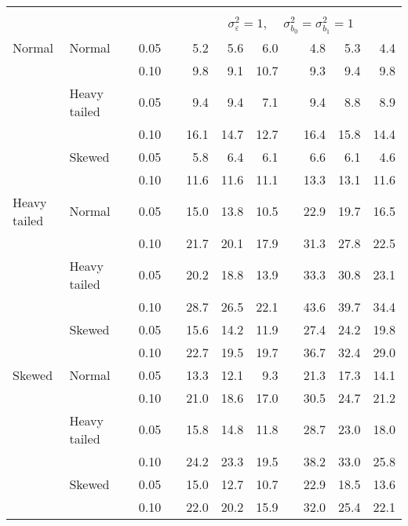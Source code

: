 \begin{table}[ht]
\begin{scriptsize}
\begin{center}
\begin{tabular}{ll p{.1cm} c p{.1cm} rrr p{.1cm} rrr}
&&&&&&&&&&&\\
& && && \multicolumn{7}{c}{$\sigma_{\varepsilon}^2 = 1$, \ \ $\sigma_{b_0}^2 = \sigma_{b_1}^2 = 1$} \\ \cline{6-12}
Normal       & Normal       && 0.05 &&   5.2 & 5.6 & 6.0 &   & 4.8 & 5.3 & 4.4 \\ 
             &              && 0.10 &&   9.8 & 9.1 & 10.7 &   & 9.3 & 9.4 & 9.8 \\ 
             & Heavy tailed && 0.05 &&   9.4 & 9.4 & 7.1 &   & 9.4 & 8.8 & 8.9 \\ 
             &              && 0.10 &&   16.1 & 14.7 & 12.7 &   & 16.4 & 15.8 & 14.4 \\ 
             & Skewed       && 0.05 &&   5.8 & 6.4 & 6.1 &   & 6.6 & 6.1 & 4.6 \\ 
             &              && 0.10 &&   11.6 & 11.6 & 11.1 &   & 13.3 & 13.1 & 11.6 \\ 
Heavy tailed & Normal       && 0.05 &&   15.0 & 13.8 & 10.5 &   & 22.9 & 19.7 & 16.5 \\ 
             &              && 0.10 &&   21.7 & 20.1 & 17.9 &   & 31.3 & 27.8 & 22.5 \\ 
             & Heavy tailed && 0.05 &&   20.2 & 18.8 & 13.9 &   & 33.3 & 30.8 & 23.1 \\ 
             &              && 0.10 &&   28.7 & 26.5 & 22.1 &   & 43.6 & 39.7 & 34.4 \\ 
             & Skewed       && 0.05 &&   15.6 & 14.2 & 11.9 &   & 27.4 & 24.2 & 19.8 \\ 
             &              && 0.10 &&   22.7 & 19.5 & 19.7 &   & 36.7 & 32.4 & 29.0 \\ 
Skewed       & Normal       && 0.05 &&   13.3 & 12.1 & 9.3 &   & 21.3 & 17.3 & 14.1 \\ 
             &              && 0.10 &&   21.0 & 18.6 & 17.0 &   & 30.5 & 24.7 & 21.2 \\ 
             & Heavy tailed && 0.05 &&   15.8 & 14.8 & 11.8 &   & 28.7 & 23.0 & 18.0 \\ 
             &              && 0.10 &&   24.2 & 23.3 & 19.5 &   & 38.2 & 33.0 & 25.8 \\ 
             & Skewed       && 0.05 &&   15.0 & 12.7 & 10.7 &   & 22.9 & 18.5 & 13.6 \\ 
             &              && 0.10 &&   22.0 & 20.2 & 15.9 &   & 32.0 & 25.4 & 22.1 \\ 


\end{tabular}
\end{center}
\end{scriptsize}
\end{table}
